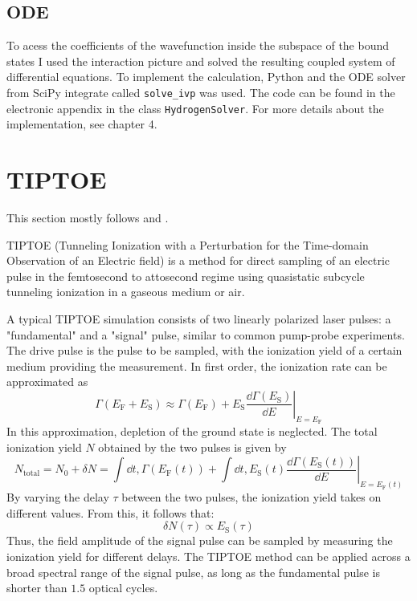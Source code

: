 \subsection{ODE}
To acess the coefficients of the wavefunction inside the subspace of the bound states I used the interaction picture and solved the resulting coupled system of differential equations. 
To implement the calculation, Python and the ODE solver from SciPy integrate called \texttt{solve\_ivp} was used.
The code can be found in the electronic appendix in the class \texttt{HydrogenSolver}.
For more details about the implementation, see chapter 4.






\section{TIPTOE}
This section mostly follows \cite{Park:18} and \cite{manorammasterthesis}.

TIPTOE (Tunneling Ionization with a Perturbation for the Time-domain Observation of an Electric field) is a method for direct sampling of an electric pulse in the femtosecond to attosecond regime using quasistatic subcycle tunneling ionization in a gaseous medium or air.

A typical TIPTOE simulation consists of two linearly polarized laser pulses: a "fundamental" and a "signal" pulse, similar to common pump-probe experiments.
The drive pulse is the pulse to be sampled, with the ionization yield of a certain medium providing the measurement.
In first order, the ionization rate can be approximated as
\begin{equation}
\Gamma(E_{\mathrm{F}}+E_{\mathrm{S}})\approx\Gamma(E_{\mathrm{F}})+\left.E_{\mathrm{S}}\frac{\dd \Gamma(E_{\mathrm{S}})}{\dd E}\right|_{E=E_{\mathrm{F}}}
\end{equation}
In this approximation, depletion of the ground state is neglected.
The total ionization yield $N$ obtained by the two pulses is given by
\begin{equation*}
N_{\mathrm{total}}=N_0+\delta N = \int \dd t,\Gamma(E_{\mathrm{F}}(t))+\int \dd t,E_{\mathrm{S}}(t)\left.\frac{\dd \Gamma(E_{\mathrm{S}}(t))}{\dd E}\right|_{E=E_{\mathrm{F}}(t)}
\end{equation*}
By varying the delay $\tau$ between the two pulses, the ionization yield takes on different values.
From this, it follows that:
\begin{equation}
\delta N(\tau)\propto E_{\mathrm{S}}(\tau) \label{eq:tiptoeprop}
\end{equation}
Thus, the field amplitude of the signal pulse can be sampled by measuring the ionization yield for different delays.
The TIPTOE method can be applied across a broad spectral range of the signal pulse, as long as the fundamental pulse is shorter than $1.5$ optical cycles.

